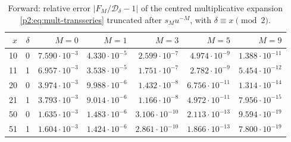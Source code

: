 \documentclass[11pt,a4paper,oneside]{book}
\theoremstyle{plain}
\theoremstyle{definition}
\theoremstyle{remark}
\begin{document}
\begin{table}[htbp]
\centering\small
\caption{Forward: relative error \(|F_M/\mathcal D_\delta-1|\) of the centred
multiplicative expansion \cref{p2:eq:mult-transseries} truncated after
\(s_Mu^{-M}\), with \(\delta\equiv x\pmod2\).}
\label{p2:tab:fwd-mult}
\begin{tabular}{r c r r r r r}
\toprule
\(x\)&\(\delta\)&\(M=0\)&\(M=1\)&\(M=3\)&\(M=5\)&\(M=9\)\\
\midrule
10&0& \(7.590\cdot10^{-3}\) & \(4.330\cdot10^{-5}\) & \(2.599\cdot10^{-7}\)
   & \(4.974\cdot10^{-9}\) & \(1.388\cdot10^{-11}\)\\
11&1& \(6.957\cdot10^{-3}\) & \(3.538\cdot10^{-5}\) & \(1.751\cdot10^{-7}\)
   & \(2.782\cdot10^{-9}\) & \(5.454\cdot10^{-12}\)\\
20&0& \(3.974\cdot10^{-3}\) & \(9.988\cdot10^{-6}\) & \(1.432\cdot10^{-8}\)
   & \(6.756\cdot10^{-11}\) & \(1.314\cdot10^{-14}\)\\
21&1& \(3.793\cdot10^{-3}\) & \(9.014\cdot10^{-6}\) & \(1.166\cdot10^{-8}\)
   & \(4.972\cdot10^{-11}\) & \(7.956\cdot10^{-15}\)\\
50&0& \(1.635\cdot10^{-3}\) & \(1.483\cdot10^{-6}\) & \(3.106\cdot10^{-10}\)
   & \(2.113\cdot10^{-13}\) & \(9.594\cdot10^{-19}\)\\
51&1& \(1.604\cdot10^{-3}\) & \(1.424\cdot10^{-6}\) & \(2.861\cdot10^{-10}\)
   & \(1.866\cdot10^{-13}\) & \(7.800\cdot10^{-19}\)\\
\bottomrule
\end{tabular}
\end{table}
\end{document}
